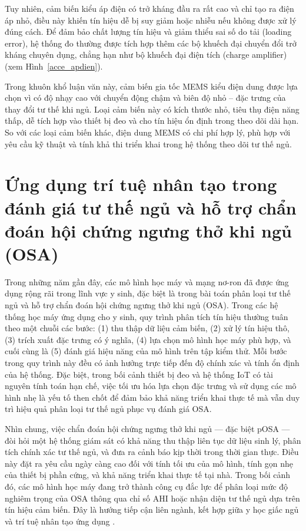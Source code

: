 Tuy nhiên, cảm biến kiểu áp điện có trở kháng đầu ra rất cao và chỉ tạo ra điện áp nhỏ, điều này khiến tín hiệu dễ bị suy giảm hoặc nhiễu nếu không được xử lý đúng cách. Để đảm bảo chất lượng tín hiệu và giảm thiểu sai số do tải (loading error), hệ thống đo thường được tích hợp thêm các bộ khuếch đại chuyển đổi trở kháng chuyên dụng, chẳng hạn như bộ khuếch đại điện tích (charge amplifier) (xem Hình~\ref{acce_apdien}).



Trong khuôn khổ luận văn này, cảm biến gia tốc MEMS kiểu điện dung được lựa chọn vì có độ nhạy cao với chuyển động chậm và biên độ nhỏ – đặc trưng của thay đổi tư thế khi ngủ. Loại cảm biến này có kích thước nhỏ, tiêu thụ điện năng thấp, dễ tích hợp vào thiết bị đeo và cho tín hiệu ổn định trong theo dõi dài hạn. So với các loại cảm biến khác, điện dung MEMS có chi phí hợp lý, phù hợp với yêu cầu kỹ thuật và tính khả thi triển khai trong hệ thống theo dõi tư thế ngủ.

\section{Ứng dụng trí tuệ nhân tạo trong đánh giá tư thế ngủ và hỗ trợ chẩn đoán hội chứng ngưng thở khi ngủ (OSA)}
Trong những năm gần đây, các mô hình học máy và mạng nơ-ron đã được 
ứng dụng rộng rãi trong lĩnh vực y sinh, đặc biệt là trong bài toán 
phân loại tư thế ngủ và hỗ trợ chẩn đoán hội chứng ngưng thở khi ngủ 
(OSA). Trong các hệ thống học máy ứng dụng cho y sinh, quy trình 
phân tích tín hiệu thường tuân theo một chuỗi các bước: (1) thu thập 
dữ liệu cảm biến, (2) xử lý tín hiệu thô, (3) trích xuất đặc trưng 
có ý nghĩa, (4) lựa chọn mô hình học máy phù hợp, và cuối cùng là 
(5) đánh giá hiệu năng của mô hình trên tập kiểm thử.
Mỗi bước trong quy trình này đều có ảnh hưởng trực tiếp đến độ chính xác 
và tính ổn định của hệ thống. Đặc biệt, trong bối cảnh thiết bị đeo và 
hệ thống IoT có tài nguyên tính toán hạn chế, việc tối ưu hóa lựa chọn 
đặc trưng và sử dụng các mô hình nhẹ là yếu tố then chốt để đảm bảo 
khả năng triển khai thực tế mà vẫn duy trì hiệu quả phân loại tư thế 
ngủ phục vụ đánh giá OSA.



Nhìn chung, việc chẩn đoán hội chứng ngưng thở khi ngủ — đặc biệt pOSA — đòi hỏi 
một hệ thống giám sát có khả năng thu thập liên tục dữ liệu sinh lý, 
phân tích chính xác tư thế ngủ, và đưa ra cảnh báo kịp thời trong 
thời gian thực. Điều này đặt ra yêu cầu ngày càng cao đối với tính tối 
ưu của mô hình, tính gọn nhẹ của thiết bị phần cứng, và khả năng triển 
khai thực tế tại nhà. Trong bối cảnh đó, các mô hình học máy đang trở thành 
công cụ đắc lực để phân loại mức độ nghiêm trọng của OSA 
thông qua chỉ số AHI hoặc nhận diện tư thế ngủ dựa trên tín hiệu cảm biến. 
Đây là hướng tiếp cận liên ngành, kết hợp giữa y học giấc ngủ và 
trí tuệ nhân tạo ứng dụng \cite{osa_sanchez2025}. 
